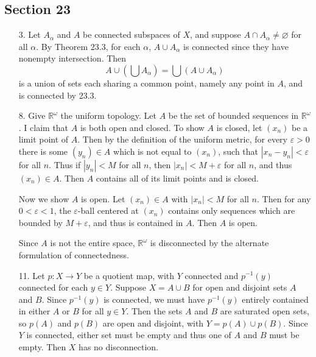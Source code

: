 \documentclass[11pt, reqno]{article}
\theoremstyle{plain}
\theoremstyle{definition}
\theoremstyle{remark}
\renewcommand{\epsilon}{\varepsilon}
\renewcommand{\emptyset}{\varnothing}
\newcommand{\RR}{\mathbb{R}}
\begin{document}
\subsection*{Section 23}

\begin{enumerate}
    \item[3.] Let $A_\alpha$ and $A$ be connected subspaces of $X$, and suppose $A \cap A_\alpha \neq \emptyset$ for all $\alpha$.
    By Theorem 23.3, for each $\alpha$, $A \cup A_\alpha$ is connected since they have nonempty intersection. 
    Then 
    \[
        A \cup (\bigcup A_\alpha) = \bigcup (A \cup A_\alpha)
    \]
    is a union of sets each sharing a common point, namely any point in $A$, and is connected by 23.3.

    \item[8.] Give $\RR^\omega$ the uniform topology. Let $A$ be the set of bounded sequences in $\RR^\omega$. I claim that 
    $A$ is both open and closed.
    \bigbreak
    To show $A$ is closed, let $(x_n)$ be a limit point of $A$. Then by the definition of the uniform metric, for every
    $\epsilon > 0$ there is some $(y_n) \in A$ which is not equal to $(x_n)$, such that $|x_n - y_n| < \epsilon$ for 
    all $n$. Thus if $|y_n| < M$ for all $n$, then $|x_n| < M + \epsilon$ for all $n$, and thus $(x_n) \in A$. Then
    $A$ contains all of its limit points and is closed. 

    Now we show $A$ is open. Let $(x_n) \in A$ with $|x_n| < M$ for all $n$. 
    Then for any $0 < \epsilon < 1$, the $\epsilon$-ball centered at $(x_n)$
    contains only sequences which are bounded by $M + \epsilon$, and thus is contained in $A$. Then $A$ is open.

    Since $A$ is not the entire space, $\RR^\omega$ is disconnected by the alternate formulation of connectedness.

    \item[11.] Let $p: X \rightarrow Y$ be a quotient map, with $Y$ connected and $p^{-1}(y)$ connected for each $y \in Y$. 
    Suppose $X = A \cup B$ for open and disjoint sets $A$ and $B$. Since $p^{-1}(y)$ is connected, we must have 
    $p^{-1}(y)$ entirely contained in either $A$ or $B$ for all $y \in Y$. Then the sets $A$ and $B$ are saturated open sets,
    so $p(A)$ and $p(B)$ are open and disjoint, with $Y = p(A) \cup p(B)$. Since $Y$ is connected, either set must be empty
    and thus one of $A$ and $B$ must be empty. Then $X$ has no disconnection.
\end{enumerate}
\end{document}
